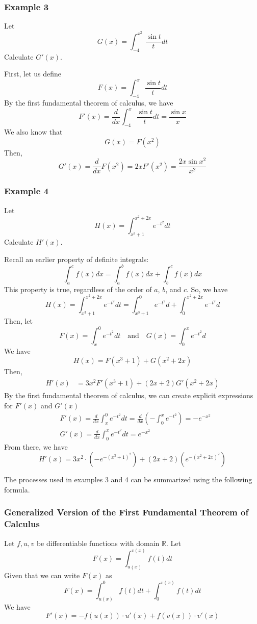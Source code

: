 \documentclass[10pt]{article}
\def\R{{\mathbb R}}
\newenvironment{solution}{\begin{tcolorbox}[colframe=_grey,colback=white,arc=0pt,outer arc=0pt]}{\end{tcolorbox}}
\begin{document}
\subsubsection{Example 3}
Let
$$
    G(x)=\int_{-4}^{x^2} \frac{\sin t}{t}dt
$$
Calculate $G'(x)$.
\begin{solution}
    First, let us define
    $$
        F(x)=\int_{-4}^x\frac{\sin t}{t} dt
    $$
    By the first fundamental theorem of calculus, we have
    $$
        F'(x)=\frac{d}{dx}\int_{-4}^x\frac{\sin t}{t}dt=\frac{\sin x}{x}
    $$
    We also know that
    $$
        G(x)=F(x^2)
    $$
    Then,
    $$
        G'(x)=\frac{d}{dx}F(x^2)=2xF'(x^2)=\frac{2x\sin x^2}{x^2}
    $$
\end{solution}
\subsubsection{Example 4}
Let
$$
    H(x)=\int_{x^3+1}^{x^2+2x} e^{-t^2}dt
$$
Calculate $H'(x)$.
\begin{solution}
    Recall an earlier property of definite integrals:
    $$
        \int_a^cf(x)dx=\int_a^bf(x)dx+\int_b^cf(x)dx
    $$
    This property is true, regardless of the order of $a$, $b$, and $c$. So, we have
    $$
        H(x)=\int_{x^3+1}^{x^2+2x} e^{-t^2}dt = \int_{x^3+1}^0 e^{-t^2}d+ \int_0^{x^2+2x}e^{-t^2}d
    $$
    Then, let
    $$
        F(x)=\int_x^{0} e^{-t^2}dt\quad\text{and}\quad G(x)=\int_{0}^x e^{-t^2}d
    $$
    We have
    $$
        H(x)=F(x^3+1)+G(x^2+2x)
    $$
    Then,
    $$
        \begin{aligned}
             H'(x) &=3 x^2F'(x^3+1)+(2x+2)G'(x^2+2x)
        \end{aligned}
    $$
    By the first fundamental theorem of calculus, we can create explicit expressions for $F'(x)$ and $G'(x)$
    $$
        \begin{aligned}
            &F'(x)=\frac{d}{dx}\int_x^0 e^{-t^2}dt=\frac{d}{dx}\left(-\int_0^xe^{-t^2}\right)=-e^{-x^2} \\
            &G'(x)=\frac{d}{dx}\int_0^xe^{-t^2}dt=e^{-x^2}
        \end{aligned}
    $$
    From there, we have
    $$
        H'(x)=3x^2\cdot\left(-e^{-(x^3+1)^2}\right)+(2x+2)\left(e^{-(x^2+2x)^2}\right)
    $$
\end{solution}
The processes used in examples 3 and 4 can be summarized using the following formula.
\subsubsection{Generalized Version of the First Fundamental Theorem of Calculus}
Let $f,u,v$ be differentiable functions with domain $\R$. Let
$$
    F(x)=\int_{u(x)}^{v(x)}f(t)dt
$$
Given that we can write $F(x)$ as 
$$
    F(x)=\int_{u(x)}^0f(t)dt+\int_{0}^{v(x)}f(t)dt
$$
We have
$$
    F'(x)=-f(u(x))\cdot u'(x)+f(v(x))\cdot v'(x)
$$
\newpage
\end{document}
